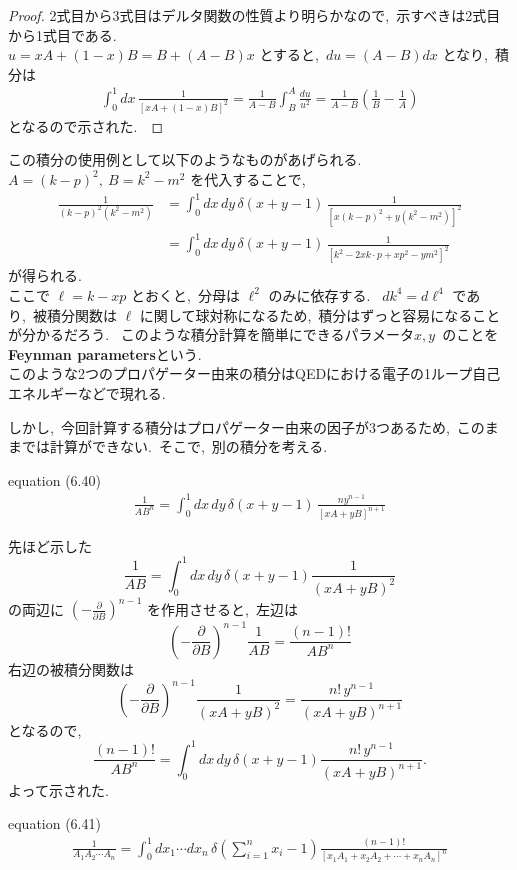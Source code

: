 \documentclass[uplatex,dvipdfmx,a4paper,11pt]{jsarticle}
\begin{document}
\begin{proof}
  2式目から3式目はデルタ関数の性質より明らかなので,~示すべきは2式目から1式目である.\\
  $u= xA + (1-x)B = B+(A-B)x$ とすると,~$du = (A-B)dx$ となり,~積分は
  \[
  \begin{aligned}
    \int_0^1 dx\,\frac{1}{[xA+(1-x)B]^2} = \frac{1}{A-B} \int_B^A \frac{du}{u^2} 
    = \frac{1}{A-B}\left( \frac{1}{B} - \frac{1}{A} \right)
  \end{aligned}
  \]
  となるので示された.~
\end{proof}
この積分の使用例として以下のようなものがあげられる.\\
$A=(k-p)^2,~B=k^2-m^2$ を代入することで,~
\[
\begin{aligned}
\frac{1}{(k-p)^2(k^2-m^2)}
&=\int_0^1 dx\,dy\,\delta(x+y-1)\,
\frac{1}{[x(k-p)^2+y(k^2-m^2)]^2}
\\
&=\int_0^1 dx\,dy\,\delta(x+y-1)\,
\frac{1}{[k^2-2xk\cdot p+xp^2-ym^2]^2}
\end{aligned}
\]
が得られる.~\\
ここで \(\ell=k-xp\) とおくと,~分母は \(\ell^2\) のみに依存する.~
$dk^4 = d\ell^4$ であり,~被積分関数は \(\ell\) に関して球対称になるため,~積分はずっと容易になることが分かるだろう.~
このような積分計算を簡単にできるパラメータ$x,y$~のことを\textbf{Feynman parameters}という.\\
このような2つのプロパゲーター由来の積分はQEDにおける電子の1ループ自己エネルギーなどで現れる.~

しかし,~今回計算する積分はプロパゲーター由来の因子が3つあるため,~このままでは計算ができない.~そこで,~別の積分を考える.
\begin{mylemma}{equation (6.40)}
  \begin{equation}
\begin{aligned}
\frac{1}{AB^n}
=\int_0^1 dx\,dy\,
\delta(x+y-1)\,
\frac{ny^{n-1}}{[xA+yB]^{n+1}}
\end{aligned} 
\end{equation}
\end{mylemma}

\begin{myproof}
先ほど示した
\[
\frac{1}{AB}
=
\int_0^1 dx\,dy\,\delta(x+y-1)
\frac{1}{(xA+yB)^2}
\]
の両辺に \(\left(-\frac{\partial}{\partial B}\right)^{n-1}\) を作用させると,~左辺は
\[
\left(-\frac{\partial}{\partial B}\right)^{n-1}
\frac{1}{AB}
=
\frac{(n-1)!}{AB^n}
\]
右辺の被積分関数は
\[
\left(-\frac{\partial}{\partial B}\right)^{n-1}
\frac{1}{(xA+yB)^2}
=
\frac{n!\,y^{n-1}}{(xA+yB)^{n+1}}
\]
となるので,
\[
\frac{(n-1)!}{AB^n}
=
\int_0^1 dx\,dy\,\delta(x+y-1)
\frac{n!\,y^{n-1}}{(xA+yB)^{n+1}}.
\]
よって示された.~  
\end{myproof}
\begin{mylemma}{equation (6.41)}
  \begin{equation}
    \begin{aligned}
\frac{1}{A_1A_2\cdots A_n}
=
\int_0^1 dx_1\cdots dx_n\,
\delta\!\left(\sum_{i=1}^n x_i-1\right)
\frac{(n-1)!}{[x_1A_1+x_2A_2+\cdots+x_nA_n]^n}
    \end{aligned}
  \end{equation}
\end{mylemma}
\end{document}
